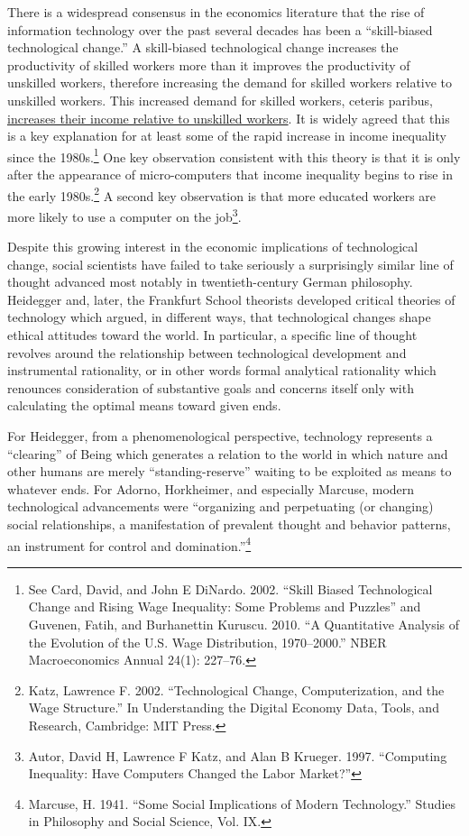\documentclass[a4paper,12pt,margin=.5in]{article}
\begin{document}
There is a widespread consensus in the economics literature that the
rise of information technology over the past several decades has been a
``skill-biased technological change.'' A skill-biased technological
change increases the productivity of skilled workers more than it
improves the productivity of unskilled workers, therefore increasing the
demand for skilled workers relative to unskilled workers. This increased
demand for skilled workers, ceteris paribus,
\href{http://www.dictionaryofeconomics.com/article?id=pde2008_S000493}{increases
their income relative to unskilled workers}. It is widely agreed that
this is a key explanation for at least some of the rapid increase in
income inequality since the 1980s.\footnote{See Card, David, and John E
  DiNardo. 2002. ``Skill Biased Technological Change and Rising Wage
  Inequality: Some Problems and Puzzles'' and Guvenen, Fatih, and
  Burhanettin Kuruscu. 2010. ``A Quantitative Analysis of the Evolution
  of the U.S. Wage Distribution, 1970--2000.'' NBER Macroeconomics
  Annual 24(1): 227--76.} One key observation consistent with this
theory is that it is only after the appearance of micro-computers that
income inequality begins to rise in the early 1980s.\footnote{Katz,
  Lawrence F. 2002. ``Technological Change, Computerization, and the
  Wage Structure.'' In Understanding the Digital Economy Data, Tools,
  and Research, Cambridge: MIT Press.} A second key observation is that
more educated workers are more likely to use a computer on the
job\footnote{Autor, David H, Lawrence F Katz, and Alan B Krueger. 1997.
  ``Computing Inequality: Have Computers Changed the Labor Market?''}.

Despite this growing interest in the economic implications of
technological change, social scientists have failed to take seriously a
surprisingly similar line of thought advanced most notably in
twentieth-century German philosophy. Heidegger and, later, the Frankfurt
School theorists developed critical theories of technology which argued,
in different ways, that technological changes shape ethical attitudes
toward the world. In particular, a specific line of thought revolves
around the relationship between technological development and
instrumental rationality, or in other words formal analytical
rationality which renounces consideration of substantive goals and
concerns itself only with calculating the optimal means toward given
ends.

For Heidegger, from a phenomenological perspective, technology
represents a ``clearing'' of Being which generates a relation to the
world in which nature and other humans are merely ``standing-reserve''
waiting to be exploited as means to whatever ends. For Adorno,
Horkheimer, and especially Marcuse, modern technological advancements
were ``organizing and perpetuating (or changing) social relationships, a
manifestation of prevalent thought and behavior patterns, an instrument
for control and domination.''\footnote{Marcuse, H. 1941. ``Some Social
  Implications of Modern Technology.'' Studies in Philosophy and Social
  Science, Vol. IX.}
\end{document}
